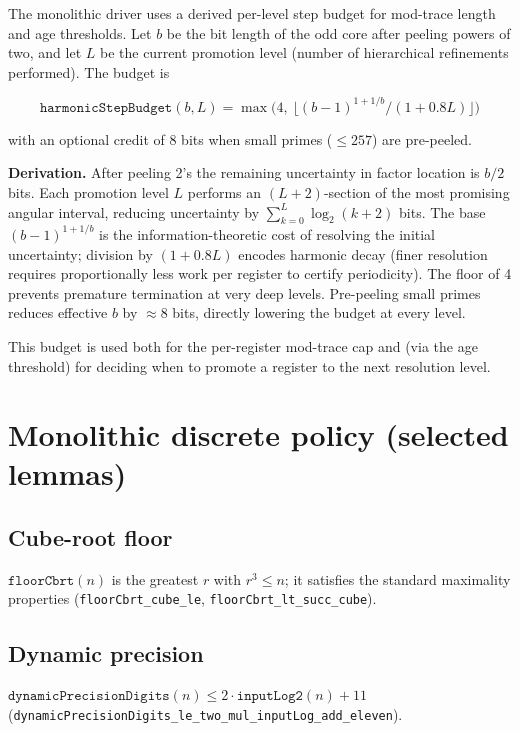 \documentclass[11pt,a4paper]{article}
\theoremstyle{plain}
\theoremstyle{definition}
\theoremstyle{remark}
\begin{document}
The monolithic driver uses a derived per-level step budget for mod-trace length
and age thresholds. Let $b$ be the bit length of the odd core after peeling powers
of two, and let $L$ be the current promotion level (number of hierarchical
refinements performed). The budget is

\[
\texttt{harmonicStepBudget}(b,L) = \max\bigl(4,\ 
\bigl\lfloor (b-1)^{1+1/b} / (1 + 0.8L) \bigr\rfloor \bigr)
\]

with an optional credit of 8 bits when small primes ($\le 257$) are pre-peeled.

\textbf{Derivation.} After peeling 2's the remaining uncertainty in factor location
is $b/2$ bits. Each promotion level $L$ performs an $(L+2)$-section of the most
promising angular interval, reducing uncertainty by $\sum_{k=0}^L \log_2(k+2)$ bits.
The base $(b-1)^{1+1/b}$ is the information-theoretic cost of resolving the initial
uncertainty; division by $(1+0.8L)$ encodes harmonic decay (finer resolution requires
proportionally less work per register to certify periodicity). The floor of 4 prevents
premature termination at very deep levels. Pre-peeling small primes reduces effective
$b$ by $\approx 8$ bits, directly lowering the budget at every level.

This budget is used both for the per-register mod-trace cap and (via the age
threshold) for deciding when to promote a register to the next resolution level.

\section{Monolithic discrete policy (selected lemmas)}

\subsection{Cube-root floor}

$\texttt{floorCbrt}(n)$ is the greatest $r$ with $r^3 \le n$; it satisfies the
standard maximality properties (\texttt{floorCbrt\_cube\_le}, \texttt{floorCbrt\_lt\_succ\_cube}).

\subsection{Dynamic precision}

$\texttt{dynamicPrecisionDigits}(n) \le 2\cdot \texttt{inputLog2}(n) + 11$
(\texttt{dynamicPrecisionDigits\_le\_two\_mul\_inputLog\_add\_eleven}).
\end{document}
